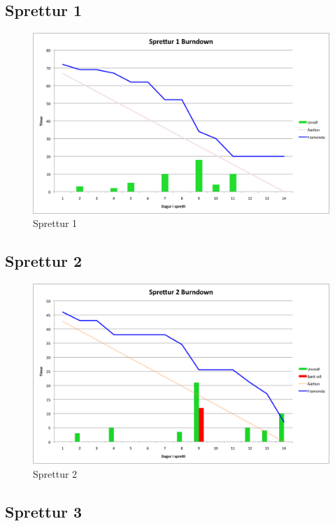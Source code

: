 \documentclass{article}
\begin{document}
\subsection{Sprettur 1}

\begin{figure}[H]
  \centering
  \includegraphics[width=1\textwidth]{Sprettur1_Burndown.png} 
  \caption{Sprettur 1} 
\end{figure}

\subsection{Sprettur 2}

\begin{figure}[H]
  \centering
  \includegraphics[width=1\textwidth]{Sprettur2_Burndown.png} 
  \caption{Sprettur 2} 
\end{figure}

\subsection{Sprettur 3}
\end{document}
